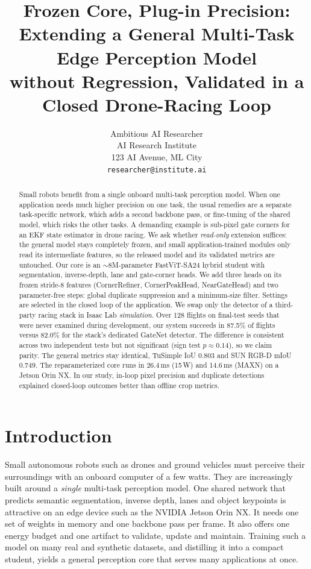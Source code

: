 \documentclass[10pt,twocolumn,letterpaper]{article}
\title{Frozen Core, Plug-in Precision: Extending a General Multi-Task Edge Perception Model\\without Regression, Validated in a Closed Drone-Racing Loop}
\author{Ambitious AI Researcher\\
AI Research Institute\\
123 AI Avenue, ML City\\
{\tt\small researcher@institute.ai}
}
\begin{document}
\maketitle

\begin{abstract}
Small robots benefit from a single onboard multi-task perception model. When one application needs much higher precision on one task, the usual remedies are a separate task-specific network, which adds a second backbone pass, or fine-tuning of the shared model, which risks the other tasks. A demanding example is sub-pixel gate corners for an EKF state estimator in drone racing. We ask whether \emph{read-only} extension suffices: the general model stays completely frozen, and small application-trained modules only read its intermediate features, so the released model and its validated metrics are untouched. Our core is an $\sim$8M-parameter FastViT-SA24 hybrid student with segmentation, inverse-depth, lane and gate-corner heads. We add three heads on its frozen stride-8 features (CornerRefiner, CornerPeakHead, NearGateHead) and two parameter-free steps: global duplicate suppression and a minimum-size filter. Settings are selected in the closed loop of the application. We swap only the detector of a third-party racing stack in Isaac Lab \emph{simulation}. Over 128 flights on final-test seeds that were never examined during development, our system succeeds in 87.5\% of flights versus 82.0\% for the stack's dedicated GateNet detector. The difference is consistent across two independent tests but not significant (sign test $p\approx0.14$), so we claim parity. The general metrics stay identical, \eg TuSimple IoU 0.803 and SUN RGB-D mIoU 0.749. The reparameterized core runs in 26.4\,ms (15\,W) and 14.6\,ms (MAXN) on a Jetson Orin NX. In our study, in-loop pixel precision and duplicate detections explained closed-loop outcomes better than offline crop metrics.
\end{abstract}

\section{Introduction}
\label{sec:intro}
Small autonomous robots such as drones and ground vehicles must perceive their surroundings with an onboard computer of a few watts. They are increasingly built around a \emph{single} multi-task perception model. One shared network that predicts semantic segmentation, inverse depth, lanes and object keypoints is attractive on an edge device such as the NVIDIA Jetson Orin NX. It needs one set of weights in memory and one backbone pass per frame. It also offers one energy budget and one artifact to validate, update and maintain. Training such a model on many real and synthetic datasets, and distilling it into a compact student, yields a general perception core that serves many applications at once.
\end{document}

